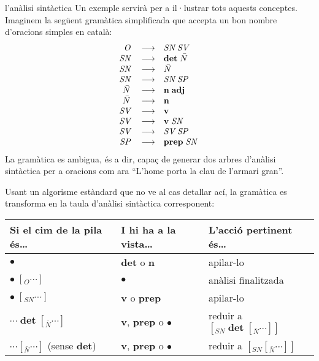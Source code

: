 \begin{persabermes}{l'anàlisi sintàctica}
  Un exemple servirà per a il·lustrar tots aquests conceptes. Imaginem
  la següent gramàtica simplificada que accepta un bon nombre
  d'oracions simples en català\label{pg:gramsenz}:
  $$
  \begin{array}{rcl}
  \mbox{\em O}\; &\longrightarrow & \mbox{\em SN}\; \mbox{\em SV}\; \\
  \mbox{\em SN}\; &\longrightarrow & \mbox{\bf det}\; \mbox{\em $\bar{N}$}\; \\
  \mbox{\em SN}\; &\longrightarrow & \mbox{\em $\bar{N}$}\; \\
  \mbox{\em SN}\; &\longrightarrow & \mbox{\em SN}\; \mbox{\em SP}\; \\
  \mbox{\em $\bar{N}$}\; &\longrightarrow & \mbox{\bf n}\; \mbox{\bf adj}\; \\
  \mbox{\em $\bar{N}$}\; &\longrightarrow & \mbox{\bf n}\; \\
  \mbox{\em SV}\; &\longrightarrow & \mbox{\bf v}\; \\
  \mbox{\em SV}\; &\longrightarrow & \mbox{\bf v}\; \mbox{\em SN}\; \\
  \mbox{\em SV}\; &\longrightarrow & \mbox{\em SV}\; \mbox{\em SP}\; \\
  \mbox{\em SP}\; &\longrightarrow & \mbox{\bf prep}\; \mbox{\em SN}\; \\
  \end{array}
  $$
  La gramàtica es ambigua, és a dir, capaç de generar dos arbres
  d'anàlisi sintàctica per a oracions com ara ``L'home porta la clau
  de l'armari gran''.

  Usant un algorisme estàndard que no ve al cas detallar ací, la
  gramàtica es transforma en la taula d'anàlisi sintàctica
  corresponent:

  \begin{center}
    \begin{tabular}{l|l|l}
      \hline
      \textsf{Si el cim de la pila és\ldots} & \textsf{I hi ha a la vista\ldots} & \textsf{L'acció pertinent
        és\ldots} \\
      \hline
      $\bullet$             & \textbf{det} o \textbf{n} & apilar-lo \\
      \hline
      $\bullet\; [_O \cdots ]$ & $\bullet$ & anàlisi finalitzada \\
      \hline 
      $\bullet\; [_{SN} \cdots ]$  & \textbf{v} o \textbf{prep} & apilar-lo \\

      \hline
  
      $\cdots\; \textbf{det} \; [_{\bar{N}} \cdots ]$  & \textbf{v},
      \textbf{prep} o $\bullet$ &reduir a $[_{SN}\;
      \textbf{det}\;[_{\bar{N}} \cdots ] ]$ \\
      \hline
      $\cdots [_{\bar{N}} \cdots ]$ (sense \textbf{det})  & \textbf{v}, \textbf{prep}
      o $\bullet$ & reduir a $[_{SN}
      [_{\bar{N}} \cdots ] ]$ \\


\end{tabular}
\end{center}
\end{persabermes}
